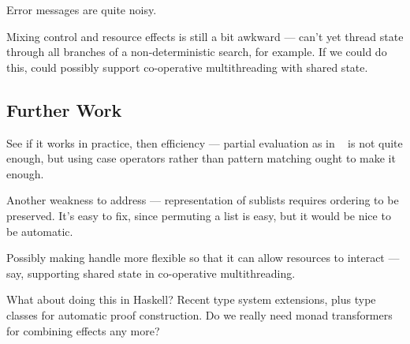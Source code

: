 Error messages are quite noisy.

Mixing control and resource effects is still a bit awkward --- can't yet
thread state through all branches of a non-deterministic search, for example.
If we could do this, could possibly support co-operative multithreading with
shared state.

\subsection{Further Work}

See if it works in practice, then efficiency --- partial evaluation as in
~\cite{Brady2010} is not quite enough, but using case operators rather
than pattern matching ought to make it enough.

Another weakness to address --- representation of sublists requires ordering
to be preserved. It's easy to fix, since permuting a list is easy, but it
would be nice to be automatic.

Possibly making handle more flexible so that it can allow resources to interact
--- say, supporting shared state in co-operative multithreading.

What about doing this in Haskell? Recent type system extensions, plus type
classes for automatic proof construction. Do we really need monad transformers
for combining effects any more?

